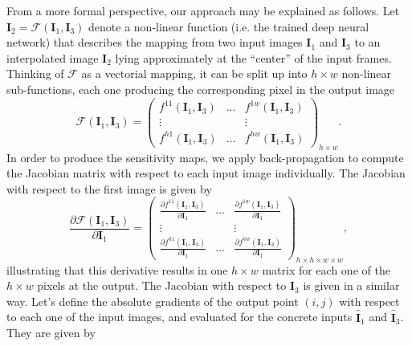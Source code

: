 \documentclass[runningheads]{llncs}
\begin{document}
	From a more formal perspective, our approach may be explained as follows. Let $\mathbf{I}_{2} = \mathcal{F}(\mathbf{I}_{1},\mathbf{I}_{3})$ denote a non-linear function (i.e. the trained deep neural network) that describes the mapping from two input images $\mathbf{I}_{1}$ and $\mathbf{I}_{3}$ to an interpolated image $\mathbf{I}_{2}$ lying approximately at the ``center'' of the input frames. Thinking of $\mathcal{F}$ as a vectorial mapping, it can be split up into $h\times w$ non-linear sub-functions, each one producing the corresponding pixel in the output image
	\begin{equation}
		\mathcal{F}(\mathbf{I}_{1},\mathbf{I}_{3}) = \left ( \begin{matrix}
			f^{11}(\mathbf{I}_{1},\mathbf{I}_{3}) & \ldots & f^{1w}(\mathbf{I}_{1},\mathbf{I}_{3}) \\
			\vdots & & \vdots \\
			f^{h1}(\mathbf{I}_{1},\mathbf{I}_{3}) & \ldots & f^{hw}(\mathbf{I}_{1},\mathbf{I}_{3})
		\end{matrix} \right)_{h\times w}.
	\end{equation}
	In order to produce the sensitivity maps, we apply back-propagation to compute the Jacobian matrix with respect to each input image individually. The Jacobian with respect to the first image is given by
	\begin{equation}
		\frac{\partial \mathcal{F}(\mathbf{I}_{1},\mathbf{I}_{3})}{\partial \mathbf{I}_{1}} = \left ( \begin{matrix}
			\frac{\partial f^{11}(\mathbf{I}_{1},\mathbf{I}_{3})}{\partial \mathbf{I}_{1}} & \ldots & \frac{\partial f^{1w}(\mathbf{I}_{1},\mathbf{I}_{3})}{\partial \mathbf{I}_{1}} \\
			\vdots & & \vdots \\
			\frac{\partial f^{h1}(\mathbf{I}_{1},\mathbf{I}_{3})}{\partial \mathbf{I}_{1}} & \ldots & \frac{\partial f^{hw}(\mathbf{I}_{1},\mathbf{I}_{3})}{\partial \mathbf{I}_{1}}
		\end{matrix} \right)_{h \times h \times w \times w},
	\end{equation}
	illustrating that this derivative results in one $h\times w$ matrix for each one of the $h\times w$ pixels at the output. The Jacobian with respect to $\mathbf{I}_{3}$ is given in a similar way. Let's define the absolute gradients of the output point $(i,j)$ with respect to each one of the input images, and evaluated for the concrete inputs $\mathbf{\hat{I}}_{1}$ and $\mathbf{\hat{I}}_{3}$. They are given by
\end{document}
